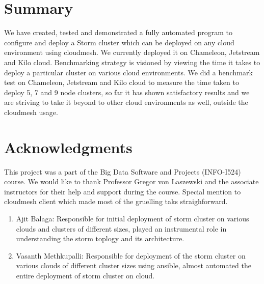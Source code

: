 \documentclass[9pt,twocolumn,twoside]{../../styles/osajnl}
\begin{document}
\section{Summary}

We have created, tested and demonstrated a fully automated program to
configure and deploy a Storm cluster which can be deployed on any
cloud environment using cloudmesh. We currently deployed it on
Chameleon, Jetstream and Kilo cloud. Benchmarking strategy is visioned
by viewing the time it takes to deploy a particular cluster on various
cloud environments. We did a benchmark test on Chameleon, Jetstream
and Kilo cloud to measure the time taken to deploy 5, 7 and 9 node
clusters, so far it has shown satisfactory results and we are striving
to take it beyond to other cloud environments as well, outside the
cloudmesh usage.

\section{Acknowledgments}
This project was a part of the Big Data Software and Projects
(INFO-I524) course. We would like to thank Professor Gregor von
Laszewski and the associate instructors for their help and support
during the course. Special mention to cloudmesh client which made most
of the gruelling taks straighforward.



\begin{enumerate}
\section{Work Breakdown}

\item Ajit Balaga: Responsible for initial deployment of storm cluster on various clouds and clusters of different sizes, played an instrumental role in understanding the storm toplogy and its architecture. 

\item Vasanth Methkupalli: Responsible for deployment of the storm cluster on various clouds of different cluster sizes using ansible, almost automated the entire deployment of storm cluster on cloud.

\end{enumerate}
\end{document}
